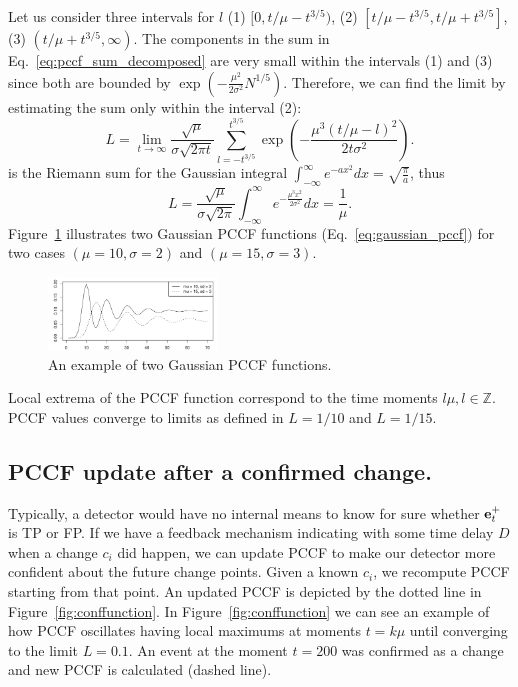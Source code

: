 Let us consider three intervals for $l$
(1) $[0, t/ \mu - t^{3/5})$,
(2) $[t/ \mu - t^{3/5}, t/ \mu + t^{3/5}]$,
(3) $(t/ \mu + t^{3/5}, \infty)$.
The components in the sum in Eq.~\ref{eq:pccf_sum_decomposed} are very small within the intervals (1) and (3) since both are bounded by $\exp(-\frac{\mu^2}{2 \sigma^2} N^{1/5})$.
Therefore, we can find the limit by estimating the sum only within the interval (2):
\begin{equation}
L = \lim_{t\to\infty} \frac{\sqrt{\mu}}{\sigma \sqrt{2\pi t}} \sum_{l=-t^{3/5}}^{t^{3/5}} \exp\left(-\frac{\mu^3 (t/\mu - l)^2}{2t\sigma^2}\right).
\label{eq:sum_before_integral}
\end{equation}
 is the Riemann sum for the Gaussian integral $\int_{-\infty}^{\infty} e^{-a x^2} dx = \sqrt{\frac{\pi}{a}} $, thus
\begin{equation}
L = \frac{\sqrt{\mu}}{\sigma \sqrt{2\pi}} \int_{-\infty}^{\infty} e^{-\frac{\mu^3 x^2}{2\sigma^2}} dx = \frac{1}{\mu}.
\label{eq:pccf_limit_proof}
\end{equation}
Figure~\ref{fig:pccf_example} illustrates two Gaussian PCCF functions (Eq.~\ref{eq:gaussian_pccf}) for two cases $(\mu=10, \sigma=2)$ and $(\mu=15, \sigma=3)$.
\begin{figure}[htb!]
\centering
\includegraphics[width=0.40\textwidth]{articles/pics/sdm_paper/pccfExamples.pdf}
\caption{An example of two Gaussian PCCF functions.
}
\label{fig:pccf_example}
\end{figure}
Local extrema of the PCCF function correspond to the time moments $l \mu, l \in \mathbb{Z}$. %
PCCF values converge to limits as defined in  $L=1/10$ and $L=1/15$.

\subsection{PCCF update after a confirmed change.}
Typically, a detector would have no internal means to know for sure whether $\mathbf{e}_{t}^{+}$ is TP or FP.
If we have a feedback mechanism indicating with some time delay $D$ when a change $c_i$ did happen,
we can update PCCF to make our detector more confident about the future change points.
Given a known $c_i$, we recompute PCCF starting from that point.
An updated PCCF is depicted by the dotted line in Figure~\ref{fig:conffunction}.
In Figure~\ref{fig:conffunction} we can see an example of how PCCF oscillates having local maximums at moments $t = k \mu$ until converging to the limit $L=0.1$.
An event at the moment $t=200$ was confirmed as a change and new PCCF is calculated (dashed line).

